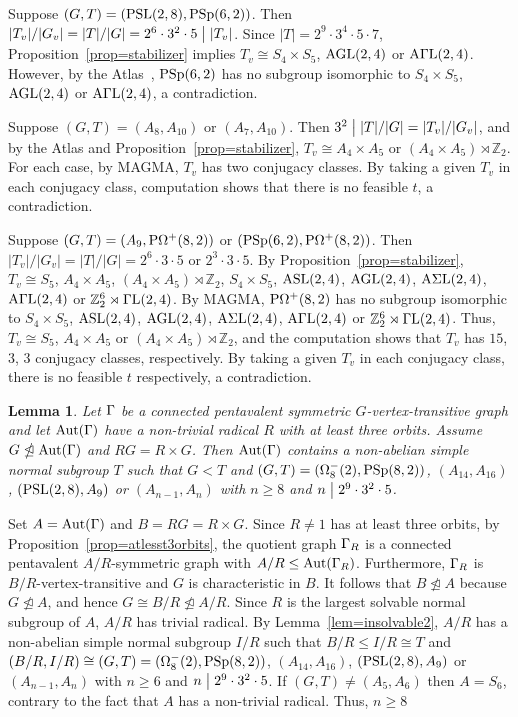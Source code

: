 \documentclass[12pt]{article}
\newtheorem{lem}{Lemma}[section]%
\def\di{\bigm|} \def\lg{\langle} \def\rg{\rangle}
\def\f{\noindent}
\def\PSL{\hbox{\rm PSL}}\def\PSU{\hbox{\rm PSU}}
\def\PSp{\hbox{\rm PSp}}\def\P\GammaL{\hbox{\rm P\Gamma L}} \def\ASIL{\hbox{\rm A\Sigma L}}
\def\Aut{\hbox{\rm Aut}}
\newcommand{\qed}{\mbox{\raisebox{0.7ex}{\fbox{}}} \vspace{4truemm}}
\def\mz{{\mathbb Z}}
\begin{document}
Suppose $(G,T)=(\PSL(2,8),\PSp(6,2))$. Then  $|T_v|/|G_v|=|T|/|G|=2^6 \cdot 3^2\cdot5\di |T_v|$.
Since $|T|=2^9 \cdot 3^4 \cdot5 \cdot7$, Proposition~\ref{prop=stabilizer} implies  $T_v\cong S_4 \times S_5$,
$\rm AGL(2,4)$ or $\rm A\Gamma L(2,4)$. However, by the Atlas~\cite[p. 46]{Atlas}, $\PSp(6,2)$ has no subgroup
isomorphic to $S_4 \times S_5$, $\rm AGL(2,4)$ or $\rm A\Gamma L(2,4)$, a contradiction.

Suppose $(G,T)=(A_8,A_{10})$ or $(A_7,A_{10})$. Then $3^2 \di |T|/|G|=|T_v|/|G_v|$, and by the Atlas \cite[p. 48]{Atlas}
and Proposition~\ref{prop=stabilizer}, $T_v\cong A_4 \times A_5$ or $(A_4 \times A_5)\rtimes \mz_2$. For each case,
by MAGMA, $T_v$ has two conjugacy classes. By taking a given $T_v$ in each conjugacy class, computation shows that
there is no feasible $t$, a contradiction.

Suppose $(G,T)=(A_9,\rm P\Omega^+(8,2))$ or $(\rm PSp(6,2),\rm P\Omega^+(8,2))$. Then $|T_v|/|G_v|=|T|/|G|=2^6\cdot 3\cdot 5$
or $2^3\cdot 3\cdot 5$. By Proposition~\ref{prop=stabilizer}, $T_v\cong S_5$, $A_4\times A_5 $, $(A_4\times A_5)\rtimes \mz_2$,
$S_4 \times S_5$, $\rm ASL(2,4)$, $\rm AGL(2,4)$, $\rm A\Sigma \rm L(2,4)$, $\rm A \Gamma \rm L(2,4)$ or $\mz_2^6\rtimes \Gamma \rm L(2,4)$. By MAGMA, $\rm P\Omega^+(8,2)$ has no subgroup isomorphic to $S_4 \times S_5$, $\rm ASL(2,4)$, $\rm AGL(2,4)$, $\rm A\Sigma \rm L(2,4)$, $\rm A \Gamma \rm L(2,4)$ or $\mz_2^6\rtimes \Gamma \rm L(2,4)$. Thus, $T_v\cong S_5$, $A_4\times A_5 $ or $(A_4\times A_5)\rtimes \mz_2$, and the computation shows that $T_v$ has $15$, $3$, $3$ conjugacy classes, respectively. By taking a given $T_v$ in each conjugacy class, there is no feasible $t$ respectively, a contradiction.
\hfill\qed

\begin{lem}\label{lem=T normal}
Let $\Gamma$ be a connected pentavalent symmetric $G$-vertex-transitive graph and
let $\Aut(\G)$ have a non-trivial radical $R$ with at least three orbits. Assume $G\ntrianglelefteq \Aut(\G)$
and $RG=R\times G$. Then $\Aut(\G)$ contains a non-abelian simple normal subgroup $T$ such that $G<T$ and $(G,T)=(\Omega^-_8(2),\PSp(8,2))$, $(A_{14},A_{16})$, $(\PSL(2,8),A_{9})$ or $(A_{n-1},A_n)$ with $n\geq 8$ and $n\di 2^9\cdot3^2\cdot5$.
\end{lem}

\f {\bf Proof:} Set $A=\Aut(\G)$ and $B=RG=R\times G$. Since $R\neq 1$ has at least three orbits,
by Proposition~\ref{prop=atlesst3orbits}, the quotient graph $\Gamma_{R}$ is a connected pentavalent
$A/R$-symmetric graph with $A/R\leq \Aut(\G_{R})$. Furthermore, $\Gamma_R$ is $B/R$-vertex-transitive and $G$
is characteristic in $B$. It follows that $B\ntrianglelefteq A$ because $G\ntrianglelefteq A$, and
hence $G\cong B/R\ntrianglelefteq A/R$. Since $R$ is the largest solvable normal subgroup of $A$,
$A/R$ has trivial radical. By Lemma~\ref{lem=insolvable2}, $A/R$ has a non-abelian simple normal subgroup $I/R$ such that $B/R\leq I/R\cong T$ and $(B/R,I/R)\cong (G,T)=(\Omega^-_8(2),\PSp(8,2))$, $(A_{14},A_{16})$, $(\PSL(2,8),A_{9})$ or $(A_{n-1},A_n)$ with $n\geq 6$ and $n\di 2^9\cdot3^2\cdot5$. If $(G,T)\not=(A_5,A_6)$ then $A=S_6$, contrary to the fact that $A$ has a non-trivial radical. Thus, $n\geq 8$
\end{document}
